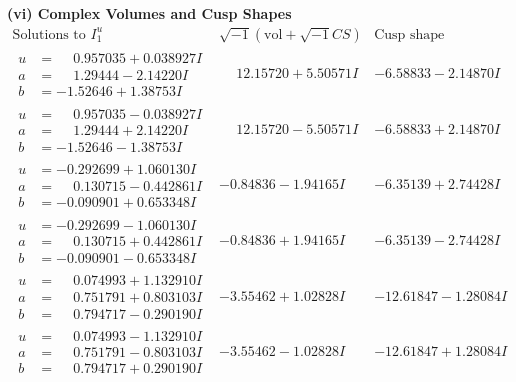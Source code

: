 \documentclass[1p]{elsarticle_modified}
\theoremstyle{definition}
\newcommand{\I}{\sqrt{-1}}
\begin{document}
\newpage\flushleft \textbf{(vi) Complex Volumes and Cusp Shapes}
$$\begin{array}{c|c|c}  
\text{Solutions to }I^u_{1}& \I (\text{vol} + \sqrt{-1}CS) & \text{Cusp shape}\\
 \hline 
\begin{aligned}
u &= \phantom{-}0.957035 + 0.038927 I \\
a &= \phantom{-}1.29444 - 2.14220 I \\
b &= -1.52646 + 1.38753 I\end{aligned}
 & \phantom{-}12.15720 + 5.50571 I & -6.58833 - 2.14870 I \\ \hline\begin{aligned}
u &= \phantom{-}0.957035 - 0.038927 I \\
a &= \phantom{-}1.29444 + 2.14220 I \\
b &= -1.52646 - 1.38753 I\end{aligned}
 & \phantom{-}12.15720 - 5.50571 I & -6.58833 + 2.14870 I \\ \hline\begin{aligned}
u &= -0.292699 + 1.060130 I \\
a &= \phantom{-}0.130715 - 0.442861 I \\
b &= -0.090901 + 0.653348 I\end{aligned}
 & -0.84836 - 1.94165 I & -6.35139 + 2.74428 I \\ \hline\begin{aligned}
u &= -0.292699 - 1.060130 I \\
a &= \phantom{-}0.130715 + 0.442861 I \\
b &= -0.090901 - 0.653348 I\end{aligned}
 & -0.84836 + 1.94165 I & -6.35139 - 2.74428 I \\ \hline\begin{aligned}
u &= \phantom{-}0.074993 + 1.132910 I \\
a &= \phantom{-}0.751791 + 0.803103 I \\
b &= \phantom{-}0.794717 - 0.290190 I\end{aligned}
 & -3.55462 + 1.02828 I & -12.61847 - 1.28084 I \\ \hline\begin{aligned}
u &= \phantom{-}0.074993 - 1.132910 I \\
a &= \phantom{-}0.751791 - 0.803103 I \\
b &= \phantom{-}0.794717 + 0.290190 I\end{aligned}
 & -3.55462 - 1.02828 I & -12.61847 + 1.28084 I \\ \hline\begin{aligned}

\end{aligned}
\end{array}$$
\end{document}
